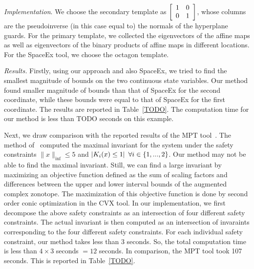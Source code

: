 \emph{Implementation}.  We choose the secondary template as
$\left[\begin{array}{ll}1 & 0\\0 & 1\end{array}\right]$, whose columns are
the pseudoinverse (in this case equal to) the normals of the
hyperplane guards.  For the primary template, we collected the
eigenvectors of the affine maps as well as eigenvectors of the binary
products of affine maps in different locations.  For the SpaceEx tool,
we choose the octagon template.

\emph{Results.}  Firstly, using our approach and also SpaceEx, we
tried to find the smallest magnitude of bounds on the two continuous
state variables.  Our method found smaller magnitude of bounds than
that of SpaceEx for the second coordinate, while these bounds were
equal to that of SpaceEx for the first coordinate.  The results are
reported in Table~\ref{TODO}.  The computation time for our method is
less than TODO seconds on this example.

Next, we draw comparison with the reported results of the MPT
tool~\cite{TODO}.  The method of~\cite{TODO} computed the maximal
invariant for the system under the safety constraints
$\|x\|_{\inf}\leq 5$ and $\left|K_i(x)\leq 1\right|~\forall i\in\{1,...,2\}$.
Our method may not be able to find the maximal invariant.  Still, we
can find a large invariant by maximizing an objective function defined
as the sum of scaling factors and differences between the upper and
lower interval bounds of the augmented complex zonotope.  The
maximization of this objective function is done by second order conic
optimization in the CVX tool.  In our implementation, we first
decompose the above safety constraints as an intersection of four
different safety constraints.  The actual invariant is then computed
as an intersection of invaraints corresponding to the four different
safety constraints.  For each individual safety constraint, our method
takes less than 3 seconds.  So, the total computation time is less
than $4\times 3$ seconds $=12$ seconds.  In comparison, the MPT tool
took 107 seconds.  This is reported in Table~\ref{TODO}.





